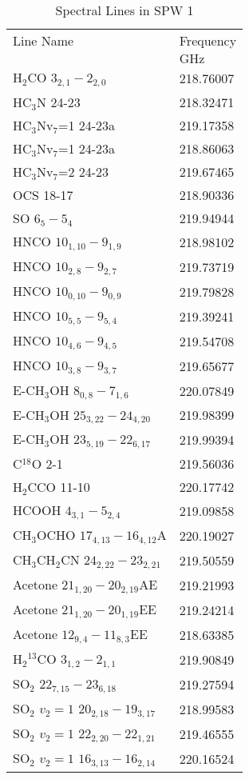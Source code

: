 \begin{table*}[htp]
\caption{Spectral Lines in SPW 1}
\begin{tabular}{ll}
\label{tab:linesspw1}
Line Name & Frequency \\
 & $\mathrm{GHz}$ \\
\hline
H$_2$CO $3_{2,1}-2_{2,0}$ & 218.76007 \\
HC$_3$N 24-23 & 218.32471 \\
HC$_3$Nv$_7$=1 24-23a & 219.17358 \\
HC$_3$Nv$_7$=1 24-23a & 218.86063 \\
HC$_3$Nv$_7$=2 24-23 & 219.67465 \\
OCS 18-17 & 218.90336 \\
SO $6_5-5_4$ & 219.94944 \\
HNCO $10_{1,10}-9_{1,9}$ & 218.98102 \\
HNCO $10_{2,8}-9_{2,7}$ & 219.73719 \\
HNCO $10_{0,10}-9_{0,9}$ & 219.79828 \\
HNCO $10_{5,5}-9_{5,4}$ & 219.39241 \\
HNCO $10_{4,6}-9_{4,5}$ & 219.54708 \\
HNCO $10_{3,8}-9_{3,7}$ & 219.65677 \\
E-CH$_3$OH $8_{0,8}-7_{1,6}$ & 220.07849 \\
E-CH$_3$OH $25_{3,22}-24_{4,20}$ & 219.98399 \\
E-CH$_3$OH $23_{5,19}-22_{6,17}$ & 219.99394 \\
C$^{18}$O 2-1 & 219.56036 \\
H$_2$CCO 11-10 & 220.17742 \\
HCOOH $4_{3,1}-5_{2,4}$ & 219.09858 \\
CH$_3$OCHO $17_{4,13}-16_{4,12}$A & 220.19027 \\
CH$_3$CH$_2$CN $24_{2,22}-23_{2,21}$ & 219.50559 \\
Acetone $21_{1,20}-20_{2,19}$AE & 219.21993 \\
Acetone $21_{1,20}-20_{1,19}$EE & 219.24214 \\
Acetone $12_{9,4}-11_{8,3}$EE & 218.63385 \\
H$_2$$^{13}$CO $3_{1,2}-2_{1,1}$ & 219.90849 \\
SO$_2$ $22_{7,15}-23_{6,18}$ & 219.27594 \\
SO$_2$ $v_2=1$ $20_{2,18}-19_{3,17}$ & 218.99583 \\
SO$_2$ $v_2=1$ $22_{2,20}-22_{1,21}$ & 219.46555 \\
SO$_2$ $v_2=1$ $16_{3,13}-16_{2,14}$ & 220.16524 \\
\hline
\end{tabular}

\end{table*}
